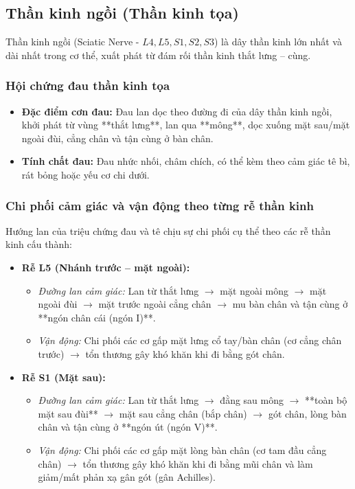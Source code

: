 \subsection{Thần kinh ngồi (Thần kinh tọa)}

Thần kinh ngồi (Sciatic Nerve - $L4, L5, S1, S2, S3$) là dây thần kinh lớn nhất và dài nhất trong cơ thể, xuất phát từ đám rối thần kinh thắt lưng -- cùng.

\subsubsection{Hội chứng đau thần kinh tọa}
\begin{itemize}
    \item \textbf{Đặc điểm cơn đau:} Đau lan dọc theo đường đi của dây thần kinh ngồi, khởi phát từ vùng **thắt lưng**, lan qua **mông**, dọc xuống mặt sau/mặt ngoài đùi, cẳng chân và tận cùng ở bàn chân.
    \item \textbf{Tính chất đau:} Đau nhức nhối, châm chích, có thể kèm theo cảm giác tê bì, rát bỏng hoặc yếu cơ chi dưới.
\end{itemize}

\subsubsection{Chi phối cảm giác và vận động theo từng rễ thần kinh}
Hướng lan của triệu chứng đau và tê chịu sự chi phối cụ thể theo các rễ thần kinh cấu thành:

\begin{itemize}
    \item \textbf{Rễ L5 (Nhánh trước -- mặt ngoài):}
    \begin{itemize}
        \item \textit{Đường lan cảm giác:} Lan từ thắt lưng $\rightarrow$ mặt ngoài mông $\rightarrow$ mặt ngoài đùi $\rightarrow$ mặt trước ngoài cẳng chân $\rightarrow$ mu bàn chân và tận cùng ở **ngón chân cái (ngón I)**.
        \item \textit{Vận động:} Chi phối các cơ gấp mặt lưng cổ tay/bàn chân (cơ cẳng chân trước) $\rightarrow$ tổn thương gây khó khăn khi đi bằng gót chân.
    \end{itemize}

    \item \textbf{Rễ S1 (Mặt sau):}
    \begin{itemize}
        \item \textit{Đường lan cảm giác:} Lan từ thắt lưng $\rightarrow$ đằng sau mông $\rightarrow$ **toàn bộ mặt sau đùi** $\rightarrow$ mặt sau cẳng chân (bắp chân) $\rightarrow$ gót chân, lòng bàn chân và tận cùng ở **ngón út (ngón V)**.
        \item \textit{Vận động:} Chi phối các cơ gấp mặt lòng bàn chân (cơ tam đầu cẳng chân) $\rightarrow$ tổn thương gây khó khăn khi đi bằng mũi chân và làm giảm/mất phản xạ gân gót (gân Achilles).
    \end{itemize}
\end{itemize}

